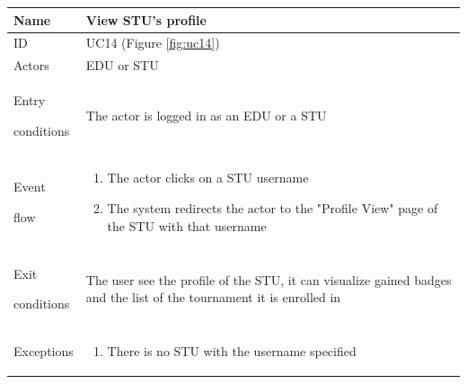 \begin{center}
    \def\arraystretch{1.5}
    \begin{tabular}{| m{2cm} | m{10cm}|}
        \hline
        Name                  & View STU's profile                                                                                                   \\ \hline
        ID                    & UC14 (Figure \ref{fig:uc14})                                                                                         \\ \hline
        Actors                & EDU or STU                                                                                                           \\ \hline
        Entry \par conditions & The actor is logged in as an EDU or a STU                                                                            \\ \hline
        Event \par flow       & \begin{enumerate}
                                    \item The actor clicks on a STU username
                                    \item The system redirects the actor to the "Profile View" page of the STU with that username
                                \end{enumerate}                         \\ \hline
        Exit \par conditions  & The user see the profile of the STU, it can visualize gained badges and the list of the tournament it is enrolled in \\ \hline
        Exceptions            & \begin{enumerate}
                                    \item There is no STU with the username specified
                                \end{enumerate}                                                                     \\ \hline
    \end{tabular}
\end{center}

